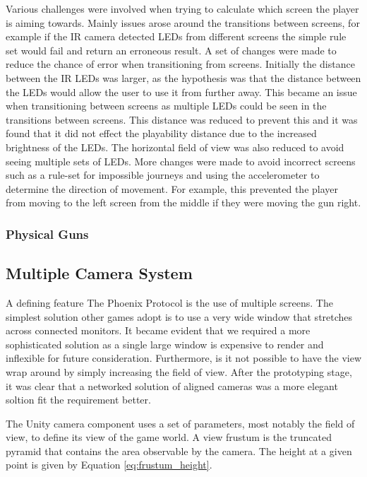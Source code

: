 \documentclass[a4paper,11pt]{article}
\begin{document}
Various challenges were involved when trying to calculate which screen the player is aiming towards. Mainly issues arose around the transitions between screens, for example if the IR camera detected LEDs from different screens the simple rule set would fail and return an erroneous result. 
A set of changes were made to reduce the chance of error when transitioning from screens. Initially the distance between the IR LEDs was larger, as the hypothesis was that the distance between the LEDs would allow the user to use it from further away. This became an issue when transitioning between screens as multiple LEDs could be seen in the transitions between screens. This distance was reduced to prevent this and it was found that it did not effect the playability distance due to the increased brightness of the LEDs. The horizontal field of view was also reduced to avoid seeing multiple sets of LEDs. More changes were made to avoid incorrect screens such as a rule-set for impossible journeys and using the accelerometer to determine the direction of movement. For example, this prevented the player from moving to the left screen from the middle if they were moving the gun right. 

\subsubsection{Physical Guns}

\subsection{Multiple Camera System}
A defining feature The Phoenix Protocol is the use of multiple screens. The simplest solution other games adopt is to use a very wide window that stretches across connected monitors. It became evident that we required a more sophisticated solution as a single large window is expensive to render and inflexible for future consideration. Furthermore, is it not possible to have the view wrap around by simply increasing the field of view. After the prototyping stage, it was clear that a networked solution of aligned cameras was a more elegant soltion fit the requirement better.

The Unity camera component\cite{unity_camera} uses a set of parameters, most notably the field of view, to define its view of the game world. A view frustum \cite{unity_frustum} is the truncated pyramid that contains the area observable by the camera. The height at a given point is given by Equation \ref{eq:frustum_height}.
\end{document}
